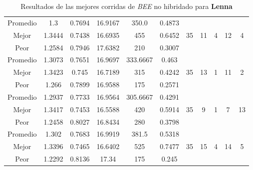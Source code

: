 \begin{table}[h!]
\begin{center}
\begin{tabular}{|c|c|c|c|c|c|c|c|c|c|c|}
        \hline
        \hline
            Promedio  & 1.3 & 0.7694 & 16.9167 & 350.0 & 0.4873 &  &  &  &  & \\
            \cline{1-6}
            Mejor & 1.3444 & 0.7438  & 16.6935 & 455 & 0.6452 & 35 & 11 & 4 & 12 & 4\\
            \cline{1-6}
            Peor & 1.2584 & 0.7946  & 17.6382 & 210 & 0.3007 &  &  &  &  & \\
        \hline
        \hline
            Promedio  & 1.3073 & 0.7651 & 16.9697 & 333.6667 & 0.463 &  &  &  &  & \\
            \cline{1-6}
            Mejor & 1.3423 & 0.745  & 16.7189 & 315 & 0.4242 & 35 & 13 & 1 & 11 & 2\\
            \cline{1-6}
            Peor & 1.266 & 0.7899  & 16.9588 & 175 & 0.2571 &  &  &  &  & \\
        \hline
        \hline
            Promedio  & 1.2937 & 0.7733 & 16.9564 & 305.6667 & 0.4291 &  &  &  &  & \\
            \cline{1-6}
            Mejor & 1.3417 & 0.7453  & 16.5588 & 420 & 0.5914 & 35 & 9 & 1 & 7 & 13\\
            \cline{1-6}
            Peor & 1.2458 & 0.8027  & 16.8434 & 280 & 0.3798 &  &  &  &  & \\
        \hline
        \hline
            Promedio  & 1.302 & 0.7683 & 16.9919 & 381.5 & 0.5318 &  &  &  &  & \\
            \cline{1-6}
            Mejor & 1.3396 & 0.7465  & 16.6402 & 525 & 0.7477 & 35 & 15 & 4 & 14 & 5\\
            \cline{1-6}
            Peor & 1.2292 & 0.8136  & 17.34 & 175 & 0.245 &  &  &  &  & \\
        \hline
        \end{tabular}
        \caption{Resultados de las mejores corridas de \emph{BEE} no hibridado para {\bf Lenna}}
        \label{tb:tablebeealgimg}
    \end{center}
\end{table}


